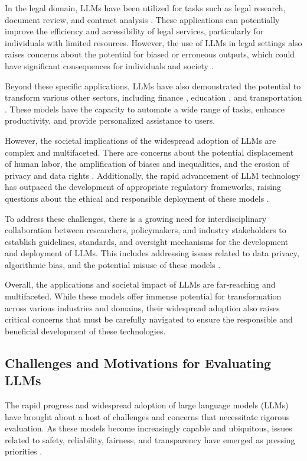 \documentclass[11pt]{article}
\begin{document}
In the legal domain, LLMs have been utilized for tasks such as legal research, document review, and contract analysis \cite{ref36,ref37}. These applications can potentially improve the efficiency and accessibility of legal services, particularly for individuals with limited resources. However, the use of LLMs in legal settings also raises concerns about the potential for biased or erroneous outputs, which could have significant consequences for individuals and society \cite{ref38}.

Beyond these specific applications, LLMs have also demonstrated the potential to transform various other sectors, including finance \cite{ref39}, education \cite{ref40}, and transportation \cite{ref41}. These models have the capacity to automate a wide range of tasks, enhance productivity, and provide personalized assistance to users.

However, the societal implications of the widespread adoption of LLMs are complex and multifaceted. There are concerns about the potential displacement of human labor, the amplification of biases and inequalities, and the erosion of privacy and data rights \cite{ref42}. Additionally, the rapid advancement of LLM technology has outpaced the development of appropriate regulatory frameworks, raising questions about the ethical and responsible deployment of these models \cite{ref7}.

To address these challenges, there is a growing need for interdisciplinary collaboration between researchers, policymakers, and industry stakeholders to establish guidelines, standards, and oversight mechanisms for the development and deployment of LLMs. This includes addressing issues related to data privacy, algorithmic bias, and the potential misuse of these models \cite{ref43}.

Overall, the applications and societal impact of LLMs are far-reaching and multifaceted. While these models offer immense potential for transformation across various industries and domains, their widespread adoption also raises critical concerns that must be carefully navigated to ensure the responsible and beneficial development of these technologies.

\subsection{Challenges and Motivations for Evaluating LLMs}

The rapid progress and widespread adoption of large language models (LLMs) have brought about a host of challenges and concerns that necessitate rigorous evaluation. As these models become increasingly capable and ubiquitous, issues related to safety, reliability, fairness, and transparency have emerged as pressing priorities \cite{ref32,ref35}.
\end{document}
